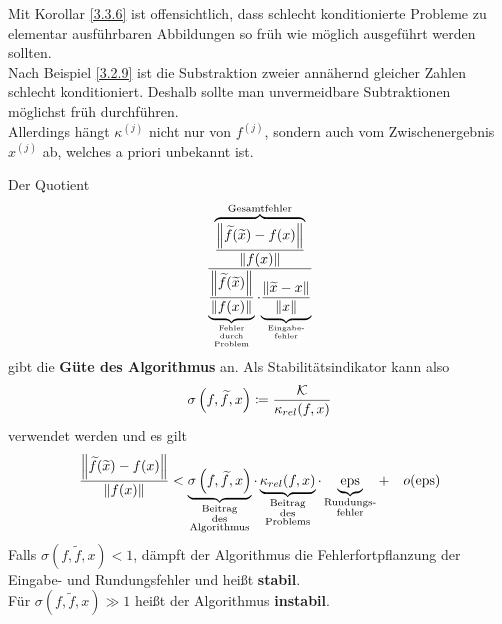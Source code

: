 \begin{Beme}
  Mit Korollar \ref{3.3.6} ist offensichtlich, dass schlecht konditionierte Probleme 
  zu elementar ausführbaren Abbildungen so früh wie möglich ausgeführt werden sollten. \\
  Nach Beispiel \ref{3.2.9} ist die Substraktion zweier annähernd gleicher Zahlen schlecht konditioniert.
  Deshalb sollte man unvermeidbare Subtraktionen möglichst früh durchführen. \\
  Allerdings hängt $\kappa^{(j)}$ nicht nur von $f^{(j)}$, sondern auch vom 
  Zwischenergebnis $x^{(j)}$ ab, welches a priori unbekannt ist.
\end{Beme}

\begin{Beme}[Sprechweise]\label{3.3.8}
  Der Quotient 
  \begin{gather}
    \frac{\overbrace{\frac{\nn[\widetilde{f}(\widetilde{x})-f(x)]}{\nn[f(x)]}}^{
        \text{Gesamtfehler}}}
    {\underbrace{\frac{\nn[\widetilde{f}(\widetilde{x})]}{\nn[f(x)]}}_{
        \scriptsize\substack{
          \text{Fehler} \\
          \text{durch} \\
          \text{Problem}
        }}
      \cdot
      {\underbrace{\frac{\nn[\widetilde{x}-x]}{\nn[x]}}_{
          \scriptsize\substack{\text{Eingabe-} \\ \text{fehler}}}}}
    \label{III.3.6}
  \end{gather}
  gibt die \textbf{Güte des Algorithmus}  an.
  Als Stabilitätsindikator kann also 
  \begin{gather}
    \sigma\left(f, \widetilde{f}, x\right) \coloneqq \frac{\K}{\kappa_{rel}(f, x)}
    \label{III.3.7}
  \end{gather}
  verwendet werden und es gilt
  \begin{gather*}
    \frac{\nn[\widetilde{f}(\widetilde{x})-f(x)]}{\nn[f(x)]}
    < \underbrace{\sigma\left( f,\widetilde{f}, x\right) }_{
      \substack{\text{Beitrag}\\
        \text{des} \\
        \text{Algorithmus}}}
    \cdot \underbrace{\kappa_{rel}(f,x)}_{
      \substack{\text{Beitrag} \\
        \text{des} \\
        \text{Problems}}}
    \cdot \underbrace{\Eps}_{\substack{\text{Rundungs-}\\\text{fehler}}}
    + \quad o(\Eps)
  \end{gather*}
  Falls $\sigma( f,\widetilde{f}, x)  < 1$, dämpft der Algorithmus die Fehlerfortpflanzung der Eingabe- und Rundungsfehler und heißt \textbf{stabil}. \\
  Für $\sigma( f,\widetilde{f}, x)  \gg 1$ heißt der Algorithmus \textbf{instabil}.
\end{Beme}



